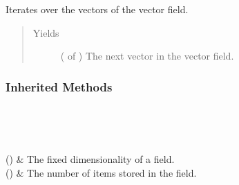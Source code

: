 \documentclass[letterpaper,10pt,english]{sphinxmanual}
\begin{document}
\begin{fulllineitems}
\begin{fulllineitems}
\label{\detokenize{api/generated/directional_clustering.fields.VectorField.vectors:directional_clustering.fields.VectorField.vectors}}
Iterates over the vectors of the vector field.
\begin{quote}\begin{description}
\item[{Yields}] \leavevmode
{} ( of ) \textendash{} The next vector in the vector field.

\end{description}\end{quote}

\end{fulllineitems}

\subsubsection*{Inherited Methods}


\begin{savenotes}\sphinxatlongtablestart\begin{longtable}[c]{}
\hline

\endfirsthead

%
{}\\
\hline

\endhead

\hline
{}\\
\endfoot

\endlastfoot

{\hyperref[\detokenize{api/generated/directional_clustering.fields.VectorField.dimensionality:directional_clustering.fields.VectorField.dimensionality}]{}}()
&
The fixed dimensionality of a field.
\\
\hline
{\hyperref[\detokenize{api/generated/directional_clustering.fields.VectorField.size:directional_clustering.fields.VectorField.size}]{}}()
&
The number of items stored in the field.
\\
\hline
\end{longtable}\sphinxatlongtableend\end{savenotes}



\end{fulllineitems}
\end{document}
